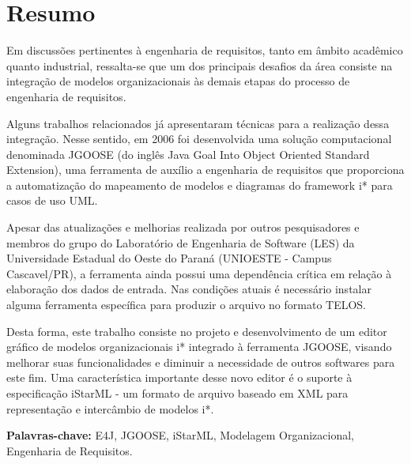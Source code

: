 \chapter*{Resumo}
\noindent

Em discussões pertinentes à engenharia de requisitos, tanto em âmbito
acadêmico quanto industrial, ressalta-se que um dos principais desafios da área
consiste na integração de modelos organizacionais às demais etapas do processo
de engenharia de requisitos.

Alguns trabalhos relacionados já apresentaram técnicas para a realização dessa integração. Nesse sentido, em 2006 foi
desenvolvida uma solução computacional denominada JGOOSE (do inglês Java Goal Into Object Oriented Standard Extension),
uma ferramenta de auxílio a engenharia de requisitos que proporciona a automatização do 
mapeamento de modelos e diagramas do framework i* para casos de uso UML.

Apesar das atualizações e melhorias realizada por outros pesquisadores e membros
do grupo do Laboratório de Engenharia de Software (LES) da Universidade Estadual do Oeste do Paraná (UNIOESTE - Campus Cascavel/PR),
a ferramenta ainda possui uma dependência crítica em relação à elaboração dos dados de entrada.
Nas condições atuais é necessário instalar alguma ferramenta específica para produzir o arquivo no formato TELOS.

Desta forma,
	este trabalho consiste no projeto e desenvolvimento de um editor gráfico de modelos organizacionais i* integrado à ferramenta JGOOSE, visando melhorar suas funcionalidades e diminuir a necessidade de outros softwares para este fim.
	Uma característica importante desse novo editor é o suporte à especificação iStarML - um formato de arquivo baseado em XML para representação e intercâmbio de modelos i*.


\vspace{1cm}

\noindent
\textbf{Palavras-chave: } E4J, JGOOSE, iStarML, Modelagem Organizacional, Engenharia de Requisitos.